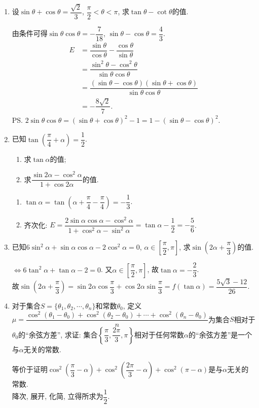 \begin{enumerate}
\item 设$\sin\theta+\cos\theta=\dfrac{\sqrt{2}}{3}$, $\dfrac{\pi}{2}<\theta<\pi$, 求$\tan\theta-\cot\theta$的值. 
\begin{jieda}
由条件可得$\sin\theta\cos\theta=-\dfrac{7}{18}$, $\sin\theta-\cos\theta=\dfrac{4}{3}$. 
\begin{align*}
E & = \dfrac{\sin\theta}{\cos\theta}-\dfrac{\cos\theta}{\sin\theta}\\
& = \dfrac{\sin^2\theta-\cos^2\theta}{\sin\theta\cos\theta}\\
& = \dfrac{(\sin\theta-\cos\theta)(\sin\theta+\cos\theta)}{\sin\theta\cos\theta}\\
& = -\dfrac{8\sqrt{2}}{7}. 
\end{align*}
\ps $2\sin\theta\cos\theta=(\sin\theta+\cos\theta)^2-1=1-(\sin\theta-\cos\theta)^2$. 
\end{jieda}


\item 已知$\tan\left(\dfrac{\pi}{4}+\alpha\right)=\dfrac{1}{2}$. 
\begin{enumerate}[(1)]
\item 求$\tan\alpha$的值; 
\item 求$\dfrac{\sin2\alpha-\cos^2\alpha}{1+\cos2\alpha}$的值. 
\end{enumerate}
\begin{jieda}
\begin{enumerate}[(1)]
\item $\tan\alpha=\tan\left(\alpha+\dfrac{\pi}{4}-\dfrac{\pi}{4}\right)=-\dfrac{1}{3}$. 

\item 齐次化: $E=\dfrac{2\sin\alpha\cos\alpha-\cos^2\alpha}{1+\cos^2\alpha-\sin^2\alpha}=\tan\alpha-\dfrac{1}{2}=-\dfrac{5}{6}$. 
\end{enumerate}
\end{jieda}


\item 已知$6\sin^2\alpha+\sin\alpha\cos\alpha-2\cos^2\alpha=0$, $\alpha\in\left[\dfrac{\pi}{2},\pi\right]$, 求$\sin\left(2\alpha+\dfrac{\pi}{3}\right)$的值. 
\begin{jieda}
$\iff 6\tan^2\alpha+\tan\alpha-2=0$. 又$\alpha\in\left[\dfrac{\pi}{2},\pi\right]$, 故$\tan\alpha=-\dfrac{2}{3}$. \\
故$\sin\left(2\alpha+\dfrac{\pi}{3}\right)=\sin2\alpha\cos\dfrac{\pi}{3}+\cos2\alpha\sin\dfrac{\pi}{3}=f(\tan\alpha)=\dfrac{5\sqrt{3}-12}{26}$. 
\end{jieda}

\item 对于集合$S=\{\theta_1,\theta_2,\cdots,\theta_n\}$和常数$\theta_0$, 
定义$\mu=\dfrac{\cos^2(\theta_1-\theta_0)+\cos^2(\theta_2-\theta_0)+\cdots+\cos^2(\theta_n-\theta_0)}{n}$为集合$S$相对于$\theta_0$的``余弦方差'', 
求证: 集合$\left\{\dfrac{\pi}{3},\dfrac{2\pi}{3},\pi\right\}$相对于任何常数$\alpha$的``余弦方差''是一个与$\alpha$无关的常数. 
\begin{jieda}
等价于证明$\cos^2\left(\dfrac{\pi}{3}-\alpha\right)+\cos^2\left(\dfrac{2\pi}{3}-\alpha\right)+\cos^2(\pi-\alpha)$是与$\alpha$无关的常数. \\
降次, 展开, 化简, 立得所求为$\dfrac{1}{2}$. 
\end{jieda}



\end{enumerate}
